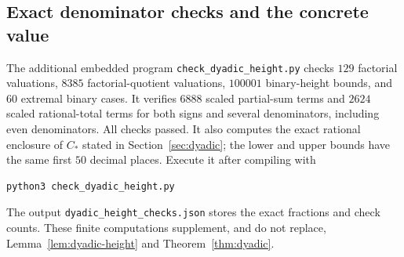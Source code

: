 \subsection{Exact denominator checks and the concrete value}
The additional embedded program \texttt{check\_dyadic\_height.py}
checks $129$ factorial valuations, $8385$ factorial-quotient
valuations, $100001$ binary-height bounds, and $60$ extremal binary
cases. It verifies $6888$ scaled partial-sum terms and $2624$ scaled
rational-total terms for both signs and several denominators,
including even denominators. All checks passed.
It also computes the exact rational enclosure of $C_*$ stated in
Section~\ref{sec:dyadic}; the lower and upper bounds have the same
first $50$ decimal places. Execute it after compiling with
\begin{lstlisting}
python3 check_dyadic_height.py
\end{lstlisting}
The output \texttt{dyadic\_height\_checks.json} stores the exact
fractions and check counts. These finite computations supplement,
and do not replace, Lemma~\ref{lem:dyadic-height} and
Theorem~\ref{thm:dyadic}.


